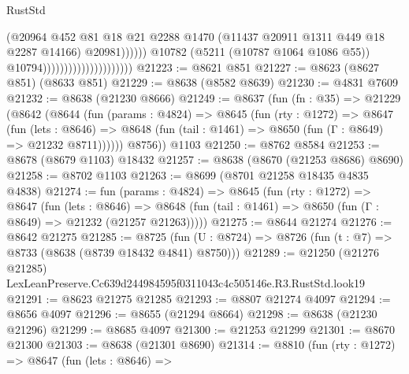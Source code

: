 \begin{lexlean}{RustStd}
\begin{coremodule}
                                                        (@20964
                                                          @452
                                                          @81
                                                          @18
                                                          @21
                                                          @2288
                                                          @1470
                                                          (@11437
                                                            @20911
                                                            @1311
                                                            @449
                                                            @18
                                                            @2287
                                                            @14166)
                                                          @20981))))))
                                              @10782
                                              (@5211 (@10787 @1064 @1086 @55))
                                              @10794)))))))))))))))))))))
@21223 := @8621 @851
@21227 := @8623 (@8627 @851) (@8633 @851)
@21229 := @8638 (@8582 @8639)
@21230 := @4831 @7609
@21232 := @8638 (@21230 @8666)
@21249 := @8637
    (fun (fn : @35) =>
    @21229
      (@8642
        (@8644
          (fun (params : @4824) =>
          @8645
            (fun (rty : @1272) =>
            @8647
              (fun (lets : @8646) =>
              @8648 (fun (tail : @1461) => @8650 (fun (Γ : @8649) => @21232 @8711))))))
        @8756))
    @1103
@21250 := @8762 @8584
@21253 := @8678 (@8679 @1103) @18432
@21257 := @8638 (@8670 (@21253 @8686) @8690)
@21258 := @8702 @1103
@21263 := @8699 (@8701 @21258 @18435 @4835 @4838)
@21274 := fun (params : @4824) =>
  @8645
    (fun (rty : @1272) =>
    @8647
      (fun (lets : @8646) =>
      @8648 (fun (tail : @1461) => @8650 (fun (Γ : @8649) => @21232 (@21257 @21263)))))
@21275 := @8644 @21274
@21276 := @8642 @21275
@21285 := @8725
    (fun (U : @8724) => @8726 (fun (t : @7) => @8733 (@8638 (@8739 @18432 @4841) @8750)))
@21289 := @21250 (@21276 @21285) LexLeanPreserve.Cc639d244984595f0311043c4c505146e.R3.RustStd.look19
@21291 := @8623 @21275 @21285
@21293 := @8807 @21274 @4097
@21294 := @8656 @4097
@21296 := @8655 (@21294 @8664)
@21298 := @8638 (@21230 @21296)
@21299 := @8685 @4097
@21300 := @21253 @21299
@21301 := @8670 @21300
@21303 := @8638 (@21301 @8690)
@21314 := @8810
    (fun (rty : @1272) =>
    @8647
      (fun (lets : @8646) =>

\end{coremodule}
\end{lexlean}
